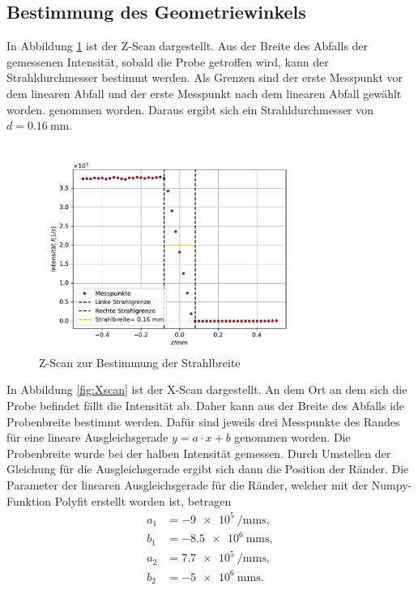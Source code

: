 \subsection{Bestimmung des Geometriewinkels}
In Abbildung \ref{fig:Zscan} ist der Z-Scan dargestellt. Aus der Breite des Abfalls der gemessenen Intensität, sobald die Probe getroffen wird, kann 
der Strahldurchmesser bestimmt werden. Als Grenzen sind der erste Messpunkt vor dem linearen Abfall und der erste Messpunkt nach dem linearen Abfall gewählt worden.
genommen worden. Daraus ergibt sich ein Strahldurchmesser von $d=\SI{0.16}{\milli\meter}$.
\begin{figure}[H]
    \centering
    \includegraphics[width=0.8\textwidth]{plots/Zscan.pdf}
    \caption{Z-Scan zur Bestimmung der Strahlbreite}
    \label{fig:Zscan}
\end{figure}
In Abbildung \ref{fig:Xscan} ist der X-Scan dargestellt. An dem Ort an dem sich die Probe befindet fällt die Intensität ab. Daher kann aus der Breite des Abfalls ide Probenbreite 
bestimmt werden. Dafür sind jeweils drei Messpunkte des Randes für eine lineare Ausgleichsgerade $y=a\cdot x+b$ genommen worden. Die Probenbreite wurde bei der halben Intensität gemessen.
Durch Umstellen der Gleichung für die Ausgleichsgerade ergibt sich dann die Position der Ränder. 
Die Parameter der linearen Ausgleichsgerade für die Ränder, welcher mit der Numpy-Funktion Polyfit erstellt worden ist, betragen
\begin{align*}
    a_1 &= \SI{-9e5}{\per\milli\meter\second}, \\
    b_1 &= \SI{-8.5e6}{\milli\meter\second}, \\
    a_2 &= \SI{7.7e5}{\per\milli\meter\second}, \\
    b_2 &= \SI{-5e6}{\milli\meter\second}.
\end{align*}
